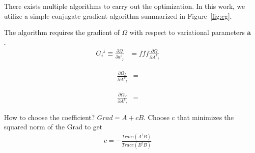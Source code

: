 \documentclass[aps,prl,reprint,amsmath,amssymb]{revtex4-1}
\begin{document}
There exists multiple algorithms to carry out the optimization. In this work, we utilize a simple conjugate gradient algorithm summarized in Figure~\ref{fig:cg}. 

The algorithm requires the gradient of $\Omega$ with respect to variational parameters $\mathbf{a}$.
%
\begin{equation} \label{eq:grad}
\begin{split}
{G_i}^j \equiv \frac{\partial \Omega}{\partial {a^i}_j} &= fff \frac{\partial \Omega}{\partial {A^k}_l}
\end{split}
\end{equation}
%

%
\begin{equation} \label{eq:grad}
\begin{split}
\frac{\partial \Omega_L}{\partial {A^k}_l} &= 
\end{split}
\end{equation}
%

%
\begin{equation} \label{eq:grad}
\begin{split}
\frac{\partial \Omega_V}{\partial {A^k}_l} &= 
\end{split}
\end{equation}
%

How to choose the coefficient? $Grad = A + c B$. Choose c that minimizes the squared norm of the Grad to get
%
\begin{equation} \label{eq:grad}
\begin{split}
c = - \frac{Trace (A^{\dagger} B)}{Trace(B^{\dagger} B)}  
\end{split}
\end{equation}
%
\end{document}
